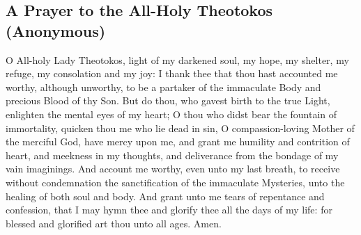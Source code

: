 \subsection{A Prayer to the All-Holy Theotokos (Anonymous)}

    O  All-holy Lady Theotokos, light of my darkened soul, my hope, my shelter, my refuge, my consolation and my joy: I thank thee that thou hast accounted me worthy, although unworthy, to be a partaker of the immaculate Body and precious Blood of thy Son. But do thou, who gavest birth to the true Light, enlighten the mental eyes of my heart; O thou who didst bear the fountain of immortality, quicken thou me who lie dead in sin, O compassion-loving Mother of the merciful God, have mercy upon me, and grant me humility and contrition of heart, and meekness in my thoughts, and deliverance from the bondage of my vain imaginings. And account me worthy, even unto my last breath, to receive without condemnation the sanctification of the immaculate Mysteries, unto the healing of both soul and body. And grant unto me tears of repentance and confession, that I may hymn thee and glorify thee all the days of my life: for blessed and glorified art thou unto all ages.  Amen.


\cleardoublepage
